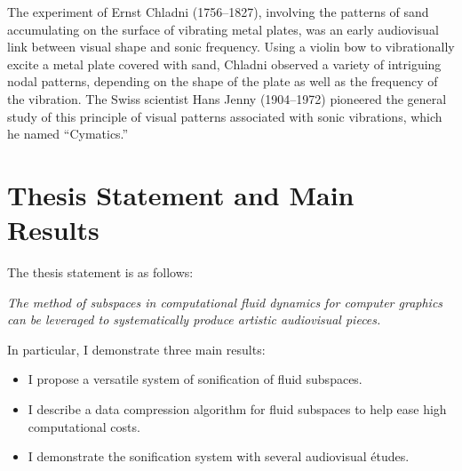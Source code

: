 The experiment of Ernst Chladni (1756--1827), involving the patterns of sand accumulating on the surface of vibrating metal plates, was an early audiovisual link between visual shape and sonic frequency. Using a violin bow to vibrationally excite a metal plate covered with sand, Chladni observed a variety of intriguing nodal patterns, depending on the shape of the plate as well as the frequency of the vibration. The Swiss scientist Hans Jenny (1904--1972) pioneered the general study of this principle of visual patterns associated with sonic vibrations, which he named ``Cymatics.'' 


\section{Thesis Statement and Main Results}
The thesis statement is as follows:

\begin{addmargin}[1em]{2em}
{\em The method of subspaces in computational fluid dynamics for computer graphics can be leveraged to systematically produce artistic audiovisual pieces.}
\end{addmargin}
In particular, I demonstrate three main results:

\begin{itemize}
	\item I propose a versatile system of sonification of fluid subspaces.
	\item I describe a data compression algorithm for fluid subspaces to help ease high computational costs.
	\item I demonstrate the sonification system with several audiovisual {\'e}tudes.
\end{itemize} 
